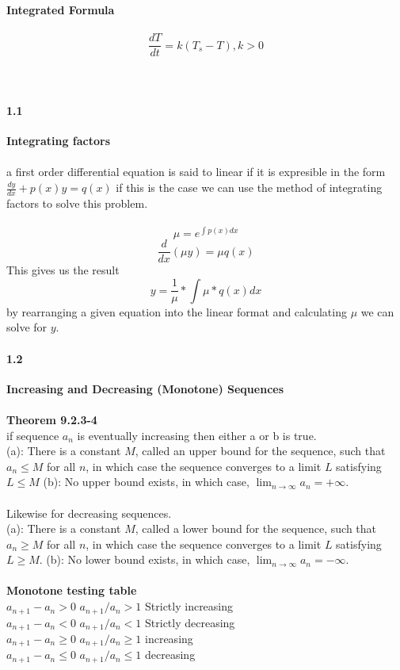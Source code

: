 \documentclass[14pt]{extreport}
\begin{document}
\textbf{Integrated Formula}\\\\
$$\frac{dT}{dt} = k(T_s - T), k > 0$$\\\\

\paragraph{1.1}\textbf{Integrating factors}\\\\

a first order differential equation is said to linear if it is expresible in the form $\frac{dy}{dx} + p(x)y = q(x)$ if this is the case we can use the method of integrating factors to solve this problem.\\\\

$$\mu = e^{\int p(x)dx}$$
$$\frac{d}{dx}(\mu y)=\mu q(x)$$
This gives us the result\\
$$y = \frac{1}{\mu} * \int \mu*q(x)dx$$
by rearranging a given equation into the linear format and calculating $\mu$ we can solve for $y$.

\paragraph{1.2}\textbf{Increasing and Decreasing (Monotone) Sequences}\\\\
\textbf{Theorem 9.2.3-4}\\
if sequence ${a_n}$ is eventually increasing then either a or b is true.\\
(a): There is a constant $M$, called an upper bound for the sequence, such that $a_n \leq M$
for all $n$, in which case the sequence converges to a limit $L$ satisfying $L \leq M$
(b): No upper bound exists, in which case, $\lim_{n \to \infty} a_n = +\infty$.\\\\

Likewise for decreasing sequences.\\
(a): There is a constant $M$, called a lower bound for the sequence, such that $a_n \geq M$
for all $n$, in which case the sequence converges to a limit $L$ satisfying $L \geq  M$.
(b): No lower bound exists, in which case, $\lim_{n \to \infty} a_n = -\infty$.\\\\

\textbf{Monotone testing table}\\
$a_{n+1} - a_{n} > 0$	$a_{n+1}/a_{n} > 1$	Strictly increasing\\
$a_{n+1} - a_{n} < 0$	$a_{n+1}/a_{n} < 1$	Strictly decreasing\\
$a_{n+1} - a_{n} \geq 0$	$a_{n+1}/a_{n} \geq 1$	increasing\\
$a_{n+1} - a_{n} \leq 0$	$a_{n+1}/a_{n} \leq 1$	decreasing\\\\
\end{document}
